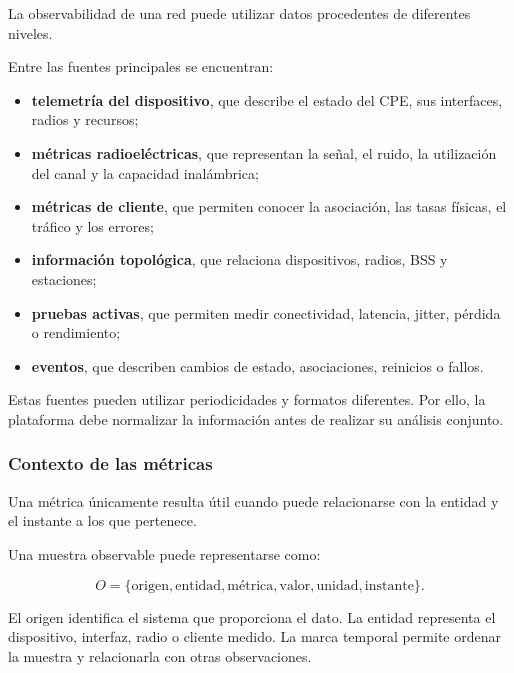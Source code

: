 La observabilidad de una red puede utilizar datos procedentes de
diferentes niveles.

Entre las fuentes principales se encuentran:

\begin{itemize}
    \item \textbf{telemetría del dispositivo}, que describe el estado
    del CPE, sus interfaces, radios y recursos;

    \item \textbf{métricas radioeléctricas}, que representan la señal,
    el ruido, la utilización del canal y la capacidad inalámbrica;

    \item \textbf{métricas de cliente}, que permiten conocer la
    asociación, las tasas físicas, el tráfico y los errores;

    \item \textbf{información topológica}, que relaciona dispositivos,
    radios, BSS y estaciones;

    \item \textbf{pruebas activas}, que permiten medir conectividad,
    latencia, jitter, pérdida o rendimiento;

    \item \textbf{eventos}, que describen cambios de estado,
    asociaciones, reinicios o fallos.
\end{itemize}

Estas fuentes pueden utilizar periodicidades y formatos diferentes. Por
ello, la plataforma debe normalizar la información antes de realizar su
análisis conjunto.


\subsubsection*{Contexto de las métricas}

Una métrica únicamente resulta útil cuando puede relacionarse con la
entidad y el instante a los que pertenece.

Una muestra observable puede representarse como:

\[
    O =
    \{
        \text{origen},
        \text{entidad},
        \text{métrica},
        \text{valor},
        \text{unidad},
        \text{instante}
    \}.
\]

El origen identifica el sistema que proporciona el dato. La entidad
representa el dispositivo, interfaz, radio o cliente medido. La marca
temporal permite ordenar la muestra y relacionarla con otras
observaciones.

